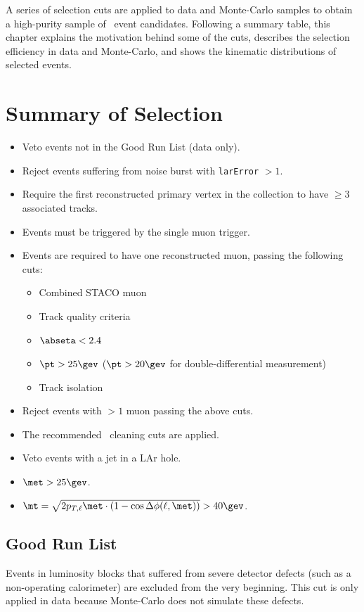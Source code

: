 
A series of selection cuts are applied to data and Monte-Carlo samples to obtain a high-purity sample of \Wboson\ event candidates. Following a summary table, this chapter explains the motivation behind some of the cuts, describes the selection efficiency in data and Monte-Carlo, and shows the kinematic distributions of selected events.

\section{Summary of Selection}
\label{sec:event:fullsel}

\begin{itemize}
\item Veto events not in the Good Run List (data only).
\item Reject events suffering from noise burst with \verb|larError| $> 1$.
\item Require the first reconstructed primary vertex in the collection to have $\ge 3$ associated tracks.
\item Events must be triggered by the single muon trigger.
\item Events are required to have one reconstructed muon, passing the following cuts:
  \begin{itemize}
  \item Combined STACO muon
  \item Track quality criteria
  \item $\abseta < 2.4$
  \item $\pt > 25\gev$ ($\pt > 20\gev$ for double-differential measurement)
  \item Track isolation
  \end{itemize}
\item Reject events with $> 1$ muon passing the above cuts.
\item The recommended \MET\ cleaning cuts are applied.
\item Veto events with a jet in a LAr hole.
\item $\met > 25\gev$.
\item $\mt = \sqrt{2 p_{T,\ell} \met \cdot (1 - \cos{\Delta\phi (\ell,
      \met) )}}> 40\gev$.
\end{itemize}

\subsection{Good Run List}
Events in luminosity blocks that suffered from severe detector defects (such as a non-operating calorimeter) are excluded from the very beginning. This cut is only applied in data because Monte-Carlo does not simulate these defects.


